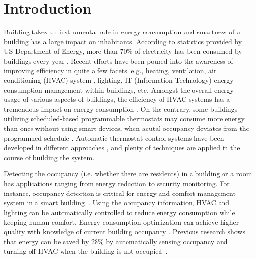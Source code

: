 \section{Introduction}
\label{sec:intro}
Building takes an instrumental role in energy consumption and smartness of a
building has a large impact on inhabitants. \textcolor{feb18rev}{According to
statistics provided by US Department of Energy, more than 70\% of electricity
has been consumed by buildings every year \cite{doe_annual}. Recent efforts
have been poured into the awareness of
improving efficiency in quite a few facets, e.g., heating, ventilation, air
conditioning (HVAC) system \cite{erickson2009energy}\cite{gao2009selfprog},
lighting\cite{delaney2009eval}, IT (Information Technology) energy consumption management within
buildings\cite{agarwal2009augnet}\cite{agarwal2010sleep}, etc.} Amongst the
overall energy usage of various aspects of buildings, the efficiency of HVAC
systems has a tremendous impact on energy consumption \cite{hobby2012analysis}.
\textcolor{feb18rev}{On the contrary, some buildings utilizing scheduled-based
programmable thermostats may consume more energy than ones without using smart
devices, when acutal occupancy deviates from the programmed schedule
\cite{bias1999elec}.} Automatic thermostat control systems have been developed
in different approaches \cite{thomas2012intelligent}\cite{lu2012eval}, and
plenty of techniques are applied in the course of building the system.

Detecting the occupancy (i.e. whether there are residents) in a building or a
room has applications ranging from energy reduction to security monitoring. For
instance, occupancy detection is critical for energy and comfort management
system in a smart building~\cite{Nguyen2013Energy}.  Using the occupancy
information, HVAC and lighting can be automatically controlled to reduce energy
consumption while keeping human comfort. Energy consumption optimization can
achieve higher quality with knowledge of current building occupancy
\cite{majumdar2014energy}. Previous research shows that energy
can be saved by 28\% by automatically sensing occupancy and turning off HVAC
when the building is not occupied~\cite{Lu:SenSys10}.

